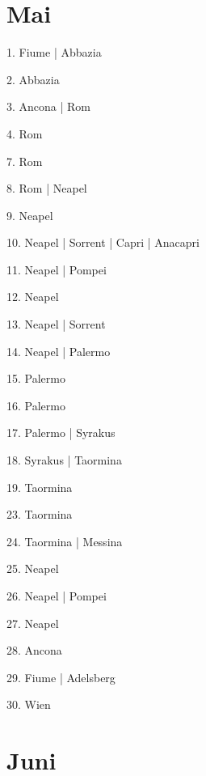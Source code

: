 \documentclass[twoside=false,titlepage=false,open=any, parskip=never, fontsize=10pt, headings=small, chapterprefix=false, appendixprefix=false, DIV=15]{scrbook}
\begin{document}
\begin{multicols}{3}
            \section*{Mai}
            1. Fiume | Abbazia\par
            2. Abbazia\par
            3. Ancona | Rom\par
            4. Rom\par
            7. Rom\par
            8. Rom | Neapel\par
            9. Neapel\par
            10. Neapel | Sorrent | Capri | Anacapri\par
            11. Neapel | Pompei\par
            12. Neapel\par
            13. Neapel | Sorrent\par
            14. Neapel | Palermo\par
            15. Palermo\par
            16. Palermo\par
            17. Palermo | Syrakus\par
            18. Syrakus | Taormina\par
            19. Taormina\par
            23. Taormina\par
            24. Taormina | Messina\par
            25. Neapel\par
            26. Neapel | Pompei\par
            27. Neapel\par
            28. Ancona\par
            29. Fiume | Adelsberg\par
            30. Wien\par
            \section*{Juni}

\end{multicols}
\end{document}
